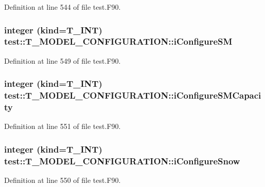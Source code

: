 Definition at line 544 of file test.F90.

\hypertarget{typetest_1_1_t___m_o_d_e_l___c_o_n_f_i_g_u_r_a_t_i_o_n_a3c5d8e90f7756f1aa83eecb2cf90ddb3}{
\subsubsection[{iConfigureSM}]{\setlength{\rightskip}{0pt plus 5cm}integer (kind={\bf T\_\-INT}) {\bf test::T\_\-MODEL\_\-CONFIGURATION::iConfigureSM}}}
\label{typetest_1_1_t___m_o_d_e_l___c_o_n_f_i_g_u_r_a_t_i_o_n_a3c5d8e90f7756f1aa83eecb2cf90ddb3}


Definition at line 549 of file test.F90.

\hypertarget{typetest_1_1_t___m_o_d_e_l___c_o_n_f_i_g_u_r_a_t_i_o_n_ae57037c8b2a22062deea5c5c963fabca}{
\subsubsection[{iConfigureSMCapacity}]{\setlength{\rightskip}{0pt plus 5cm}integer (kind={\bf T\_\-INT}) {\bf test::T\_\-MODEL\_\-CONFIGURATION::iConfigureSMCapacity}}}
\label{typetest_1_1_t___m_o_d_e_l___c_o_n_f_i_g_u_r_a_t_i_o_n_ae57037c8b2a22062deea5c5c963fabca}


Definition at line 551 of file test.F90.

\hypertarget{typetest_1_1_t___m_o_d_e_l___c_o_n_f_i_g_u_r_a_t_i_o_n_aa237147ae250074f6cde1fb1b4d447d4}{
\subsubsection[{iConfigureSnow}]{\setlength{\rightskip}{0pt plus 5cm}integer (kind={\bf T\_\-INT}) {\bf test::T\_\-MODEL\_\-CONFIGURATION::iConfigureSnow}}}
\label{typetest_1_1_t___m_o_d_e_l___c_o_n_f_i_g_u_r_a_t_i_o_n_aa237147ae250074f6cde1fb1b4d447d4}


Definition at line 550 of file test.F90.

